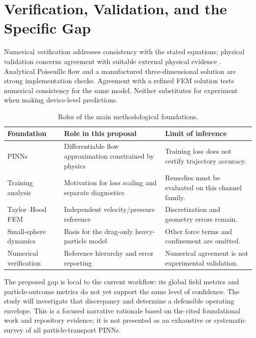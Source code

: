 \section{Verification, Validation, and the Specific Gap}
Numerical verification addresses consistency with the stated equations;
physical validation concerns agreement with suitable external physical
evidence \cite{roache1998}. Analytical Poiseuille flow and a manufactured
three-dimensional solution are strong implementation checks. Agreement with
a refined FEM solution tests numerical consistency for the same model.
Neither substitutes for experiment when making device-level predictions.

\begin{table}[!htbp]
\centering\small
\caption{Roles of the main methodological foundations.}
\label{tab:literature}
\begin{tabularx}{\textwidth}{@{}p{}YY@{}}
\toprule Foundation & Role in this proposal & Limit of inference\\\midrule
PINNs \cite{raissi2019,karniadakis2021} & Differentiable flow approximation constrained by physics & Training loss does not certify trajectory accuracy.\\
Training analysis \cite{wang2021,wang2022} & Motivation for loss scaling and separate diagnostics & Remedies must be evaluated on this channel family.\\
Taylor--Hood FEM \cite{taylor1973} & Independent velocity/pressure reference & Discretization and geometry errors remain.\\
Small-sphere dynamics \cite{maxey1983} & Basis for the drag-only heavy-particle model & Other force terms and confinement are omitted.\\
Numerical verification \cite{roache1998} & Reference hierarchy and error reporting & Numerical agreement is not experimental validation.\\
\bottomrule
\end{tabularx}
\end{table}

The proposed gap is local to the current workflow: its global field metrics
and particle-outcome metrics do not yet support the same level of confidence.
The study will investigate that discrepancy and determine a defensible
operating envelope. This is a focused narrative rationale based on the cited
foundational work and repository evidence; it is not presented as an
exhaustive or systematic survey of all particle-transport PINNs.
